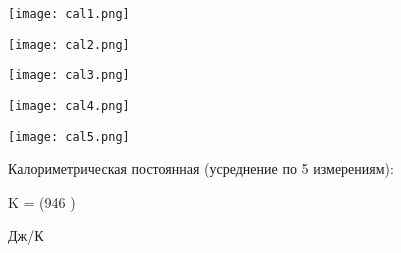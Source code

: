 \documentclass[a4paper]{article}
\begin{document}
\graphicspath{{./images/}}
		\begin{center}
		
			\texttt{[image: cal1.png]}
	

	\par
 \vspace{0.3cm}
 \end{center}


\graphicspath{{./images/}}
		\begin{center}
		
			\texttt{[image: cal2.png]}
	

	\par
 \vspace{0.3cm}
 \end{center}
\vspace{0.3cm}
\par


\graphicspath{{./images/}}
		\begin{center}
		
			\texttt{[image: cal3.png]}
	

	\par
 \vspace{0.3cm}
 \end{center}
\vspace{0.3cm}
\par

\graphicspath{{./images/}}
		\begin{center}
		
			\texttt{[image: cal4.png]}
	

	\par
 \vspace{0.3cm}
 \end{center}
\vspace{0.3cm}
\par

\graphicspath{{./images/}}
		\begin{center}
		
			\texttt{[image: cal5.png]}
	

	\par
 \vspace{0.3cm}
 \end{center}
\vspace{0.3cm}
\par

Калориметрическая постоянная (усреднение по 5 измерениям):
\begin{center}
\begin{mathmode}

\LARGE K = (946 ) \end{mathmode} \LARGE Дж/К
\end{center}
\end{document}
